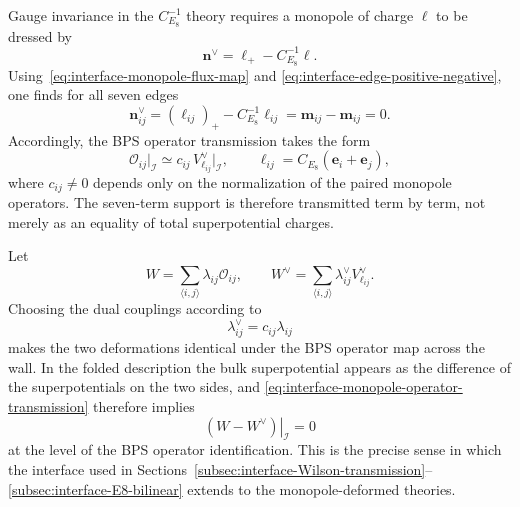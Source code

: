 \documentclass[11pt,a4paper]{article}
\numberwithin{equation}{section}
\begin{document}
Gauge invariance in the $C_{E_8}^{-1}$ theory requires a monopole of charge $\boldsymbol\ell$ to be dressed by
\begin{equation}
  \boldsymbol n^\vee
  =\boldsymbol\ell_+-C_{E_8}^{-1}\boldsymbol\ell.
  \label{eq:interface-dual-dressing}
\end{equation}
Using~\eqref{eq:interface-monopole-flux-map} and \eqref{eq:interface-edge-positive-negative}, one finds for all seven edges
\begin{equation}
  \boldsymbol n^\vee_{ij}
  =(\boldsymbol\ell_{ij})_+
  -C_{E_8}^{-1}\boldsymbol\ell_{ij}
  =\boldsymbol m_{ij}-\boldsymbol m_{ij}=0.
  \label{eq:interface-dual-monopoles-bare}
\end{equation}
Accordingly, the BPS operator transmission takes the form
\begin{equation}
  \mathcal O_{ij}
  \big|_{\mathcal I}
  \simeq
  c_{ij}\,
  V^\vee_{\boldsymbol\ell_{ij}}
  \big|_{\mathcal I},
  \qquad
  \boldsymbol\ell_{ij}
  =C_{E_8}(\boldsymbol e_i+\boldsymbol e_j),
  \label{eq:interface-monopole-operator-transmission}
\end{equation}
where $c_{ij}\neq0$ depends only on the normalization of the paired monopole operators.  The seven-term support is therefore transmitted term by term, not merely as an equality of total superpotential charges.

Let
\begin{equation}
  W=\sum_{\langle i,j\rangle}\lambda_{ij}\mathcal O_{ij},
  \qquad
  W^\vee=\sum_{\langle i,j\rangle}\lambda_{ij}^\vee
  V^\vee_{\boldsymbol\ell_{ij}}.
  \label{eq:interface-paired-superpotentials}
\end{equation}
Choosing the dual couplings according to
\begin{equation}
  \lambda_{ij}^\vee=c_{ij}\lambda_{ij}
  \label{eq:interface-coupling-map}
\end{equation}
makes the two deformations identical under the BPS operator map across the wall.  In the folded description the bulk superpotential appears as the difference of the superpotentials on the two sides, and \eqref{eq:interface-monopole-operator-transmission} therefore implies
\begin{equation}
  \left.(W-W^\vee)\right|_{\mathcal I}=0
  \label{eq:interface-superpotential-difference}
\end{equation}
at the level of the BPS operator identification.  This is the precise sense in which the interface used in Sections~\ref{subsec:interface-Wilson-transmission}--\ref{subsec:interface-E8-bilinear} extends to the monopole-deformed theories.
\end{document}
